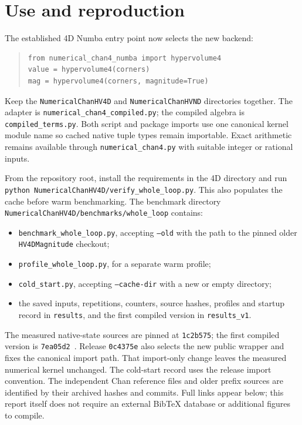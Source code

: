 \documentclass[12pt,a4paper]{article}
\begin{document}
\section{Use and reproduction}
The established 4D Numba entry point now selects the new backend:
\begin{quote}\small
\begin{verbatim}
from numerical_chan4_numba import hypervolume4
value = hypervolume4(corners)
mag = hypervolume4(corners, magnitude=True)
\end{verbatim}
\end{quote}
Keep the \texttt{NumericalChanHV4D} and \texttt{NumericalChanHVND} directories
together. The adapter is \texttt{numerical\_chan4\_compiled.py}; the compiled
algebra is \texttt{compiled\_terms.py}. Both script and package imports use
one canonical kernel module name so cached native tuple types remain importable.
Exact arithmetic remains available through \texttt{numerical\_chan4.py}
with suitable integer or rational inputs.

From the repository root, install the requirements in the 4D directory and run
\texttt{python NumericalChanHV4D/verify\_whole\_loop.py}. This also populates
the cache before warm benchmarking. The benchmark directory
\texttt{NumericalChanHV4D/benchmarks/whole\_loop} contains:
\begin{itemize}
\item \texttt{benchmark\_whole\_loop.py}, accepting \texttt{--old} with the
path to the pinned older \texttt{HV4DMagnitude} checkout;
\item \texttt{profile\_whole\_loop.py}, for a separate warm profile;
\item \texttt{cold\_start.py}, accepting \texttt{--cache-dir} with a new or
empty directory;
\item the saved inputs, repetitions, counters, source hashes, profiles and
startup record in \texttt{results}, and the first compiled version in
\texttt{results\_v1}.
\end{itemize}

The measured native-state sources are pinned at \texttt{1c2b575}; the first
compiled version is \texttt{7ea05d2}~\cite{timed}. Release \texttt{0c4375e} also selects
the new public wrapper and fixes the canonical import path. That import-only
change leaves the measured numerical kernel unchanged. The cold-start record
uses the release import convention. The independent Chan reference files and
older prefix sources are identified by their archived hashes and commits.
Full links appear below; this report itself does not require an external
BibTeX database or additional figures to compile.
\end{document}
